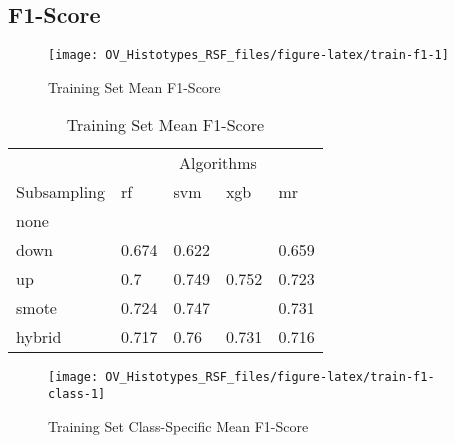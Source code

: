 \documentclass[
]{report}
\begin{document}
\subsection{F1-Score}\label{f1-score-1}

\begin{figure}[H]

{\centering \texttt{[image: OV\_Histotypes\_RSF\_files/figure-latex/train-f1-1]} 

}

\caption{Training Set Mean F1-Score}\label{fig:train-f1}
\end{figure}

\begin{table}

\caption{\label{tab:train-f1-table}Training Set Mean F1-Score}
\centering
\begin{tabular}[t]{l|l|l|l|l}
\hline
\multicolumn{1}{c|}{ } & \multicolumn{4}{c}{Algorithms} \\
\cline{2-5}
Subsampling & rf & svm & xgb & mr\\
\hline
none & \cellcolor[HTML]{FFD700}{0.819} & \cellcolor[HTML]{FFD700}{0.799} & \cellcolor[HTML]{FF0000}{0.78} & \cellcolor[HTML]{FF0000}{0.851}\\
\hline
down & 0.674 & 0.622 & \cellcolor[HTML]{FF0000}{0.415} & 0.659\\
\hline
up & 0.7 & 0.749 & 0.752 & 0.723\\
\hline
smote & 0.724 & 0.747 & \cellcolor[HTML]{90ee90}{0.771} & 0.731\\
\hline
hybrid & 0.717 & 0.76 & 0.731 & 0.716\\
\hline
\end{tabular}
\end{table}

\begin{figure}[H]

{\centering \texttt{[image: OV\_Histotypes\_RSF\_files/figure-latex/train-f1-class-1]} 

}

\caption{Training Set Class-Specific Mean F1-Score}\label{fig:train-f1-class}
\end{figure}
\end{document}
